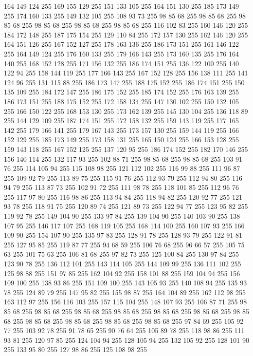 164 149 124 255 169 155 129 255 151 133 105 255 164 151 130 255 185 173 149 255 174 160 133 255 149 132 105 255 108 93 73 255 98 85 68 255 98 85 68 255 98 85 68 255 98 85 68 255 98 85 68 255 98 85 68 255 116 102 83 255 160 146 120 255 184 172 148 255 187 175 154 255 129 110 84 255 172 157 130 255 162 146 120 255 164 151 126 255 167 152 127 255 178 163 136 255 186 173 151 255 161 146 122 255 164 149 124 255 176 160 133 255 179 166 143 255 173 160 135 255 176 164 140 255 168 152 128 255 171 156 132 255 186 174 151 255 136 122 100 255 140 122 94 255 158 144 119 255 177 166 143 255 167 152 128 255 156 138 111 255 141 124 96 255 131 115 88 255 186 173 147 255 188 175 152 255 186 174 151 255 150 135 109 255 184 172 147 255 186 175 152 255 185 174 152 255 176 163 139 255 186 173 151 255 188 175 152 255 172 158 134 255 147 130 102 255 150 132 105 255 166 150 122 255 168 153 130 255 173 162 139 255 145 130 104 255 136 118 89 255 144 129 109 255 187 174 151 255 172 158 132 255 159 143 119 255
177 165 142 255 179 166 141 255 179 167 143 255 173 157 130 255 159 144 119 255 166 152 129 255 185 173 149 255 173 158 131 255 165 150 124 255 166 153 128 255 159 143 118 255 167 152 125 255 137 120 95 255 186 174 152 255 182 170 146 255 156 140 114 255 132 117 93 255 102 88 71 255 98 85 68 255 98 85 68 255 103 91 76 255 114 105 94 255 115 108 98 255 121 112 102 255 116 99 88 255 111 96 87 255 109 92 79 255 113 89 75 255 115 91 76 255 112 93 79 255 112 94 80 255 116 94 79 255 113 87 73 255 102 91 72 255 111 98 78 255 118 101 85 255 112 96 76 255 117 97 80 255 116 98 86 255 113 94 84 255 118 94 82 255 120 92 77 255 121 93 78 255 118 91 75 255 120 89 74 255 121 89 73 255 122 94 77 255 123 95 82 255 119 92 78 255 149 104 90 255 133 97 84 255 139 104 90 255 140 103 90 255 138 107 95 255 146 117 107 255 168 119 105 255 168 114 100 255 160 107 93 255 166 109 90 255 154 107 90 255 135 97 83 255 128 91 78 255 128 93 79 255 122 91 81 255
127 95 85 255 119 87 77 255 94 68 59 255 106 76 68 255 96 66 57 255 105 75 63 255 101 75 63 255 106 81 68 255 97 82 73 255 125 100 84 255 130 97 84 255 123 90 78 255 136 112 101 255 143 114 105 255 144 109 99 255 136 111 102 255 125 98 88 255 151 97 85 255 162 104 92 255 158 101 88 255 159 104 94 255 156 109 100 255 138 93 86 255 151 109 100 255 143 105 93 255 140 108 94 255 135 93 78 255 124 89 79 255 147 95 82 255 155 98 87 255 164 104 89 255 162 112 98 255 163 112 97 255 156 116 103 255 157 115 104 255 148 107 93 255 106 87 71 255 98 85 68 255 98 85 68 255 98 85 68 255 98 85 68 255 98 85 68 255 98 85 68 255 98 85 68 255 98 85 68 255 98 85 68 255 98 85 68 255 98 85 68 255 97 84 69 255 105 92 77 255 103 92 78 255 91 78 65 255 90 76 64 255 105 89 78 255 118 98 86 255 111 93 81 255 120 97 85 255 124 104 94 255 128 105 94 255 132 105 92 255 128 101 90 255 133 95 80 255 127 98 86 255 125 108 98 255
